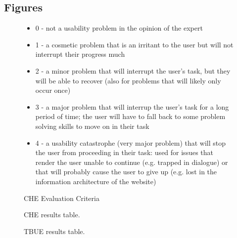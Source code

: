 \begin{appendices}
  \section{Figures}
  \begin{center}

    \begin{figure}[htbp]
      \begin{itemize}
      \item 0 - not a usability problem in the opinion of the expert
      \item 1 - a cosmetic problem that is an irritant to the user but will not interrupt their progress much
      \item 2 - a minor problem that will interrupt the user's task, but they will be able to recover (also for problems that will likely only occur once)
      \item 3 - a major problem that will interrup the user's task for a long period of time; the user will have to fall back to some problem solving skills to move on in their task
      \item 4 - a usability catastrophe (very major problem) that will stop the user from proceeding in their task: used for issues that render the user unable to continue (e.g. trapped in dialogue) or that will probably cause the user to give up (e.g. lost in the information architecture of the website)
      \end{itemize}
      \caption{CHE Evaluation Criteria}
      \label{che1}
    \end{figure}

    \begin{figure}[htbp]
      
      \caption{CHE results table.}
      \label{che2}
    \end{figure}
    

    

    \begin{figure}[htbp]
      
      \caption{TBUE results table.}
      \label{tbue1}
    \end{figure}

  \end{center}
\end{appendices}
